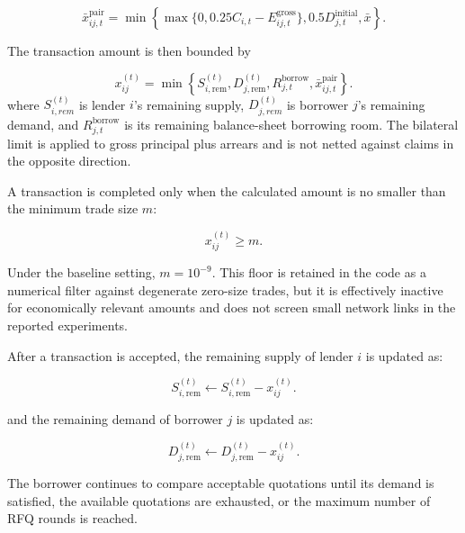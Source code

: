 \begin{equation}
\bar x_{ij,t}^{\mathrm{pair}}
=\min\left\{
\max\{0,0.25C_{i,t}-E_{ij,t}^{\mathrm{gross}}\},
0.5D_{j,t}^{\mathrm{initial}},\bar x
\right\}.
\label{eq:rfq-pair-cap}
\end{equation}

The transaction amount is then bounded by


\begin{equation}
x_{ij}^{(t)}=\min\left\{S_{i,\mathrm{rem}}^{(t)},D_{j,\mathrm{rem}}^{(t)},
R_{j,t}^{\mathrm{borrow}},\bar x_{ij,t}^{\mathrm{pair}}\right\}
\label{eq:rfq-amount}.
\end{equation}
\vspace{-0.4\baselineskip}
\noindent where \(S_{i,rem}^{(t)}\) is lender \(i\)'s remaining supply,
\(D_{j,rem}^{(t)}\) is borrower \(j\)'s remaining demand, and
\(R_{j,t}^{\mathrm{borrow}}\) is its remaining balance-sheet borrowing room.
The bilateral limit is applied to gross principal plus arrears and is not
netted against claims in the opposite direction.

A transaction is completed only when the calculated amount is no smaller
than the minimum trade size \(m\):


\begin{equation}
x_{ij}^{(t)}\geq m.
\end{equation}


Under the baseline setting, \(m=10^{-9}\). This floor is retained in the
code as a numerical filter against degenerate zero-size trades, but it is
effectively inactive for economically relevant amounts and does not screen
small network links in the reported experiments.

After a transaction is accepted, the remaining supply of lender \(i\) is
updated as:


\begin{equation}
S_{i,\mathrm{rem}}^{(t)}\leftarrow S_{i,\mathrm{rem}}^{(t)}-x_{ij}^{(t)}.
\end{equation}


and the remaining demand of borrower \(j\) is updated as:


\begin{equation}
D_{j,\mathrm{rem}}^{(t)}\leftarrow D_{j,\mathrm{rem}}^{(t)}-x_{ij}^{(t)}.
\end{equation}


The borrower continues to compare acceptable quotations until its demand
is satisfied, the available quotations are exhausted, or the maximum
number of RFQ rounds is reached.

